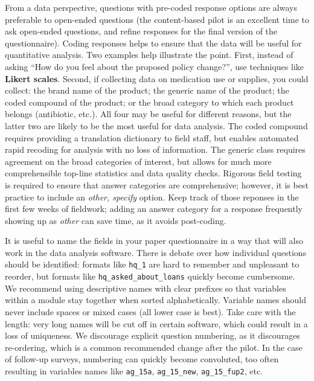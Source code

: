 From a data perspective, questions with pre-coded response options are always preferable to open-ended questions (the content-based pilot is an excellent time to ask open-ended questions, and refine responses for the final version of the questionnaire). Coding responses helps to ensure that the data will be useful for quantitative analysis. Two examples help illustrate the point. First, instead of asking ``How do you feel about the proposed policy change?'', use techniques like
\textbf{Likert scales}. Second, if collecting data on medication use or supplies, you could collect: the brand name of the product; the generic name of the product; the coded compound of the product; or the broad category to which each product belongs (antibiotic, etc.). All four may be useful for different reasons, but the latter two are likely to be the most useful for data analysis. The coded compound requires providing a translation dictionary to field staff, but enables automated rapid recoding for analysis with no loss of information. The generic class requires agreement on the broad categories of interest, but allows for much more comprehensible top-line statistics and data quality checks. Rigorous field testing is required to ensure that answer categories are comprehensive; however, it is best practice to include an \textit{other, specify} option. Keep track of those reponses in the first few weeks of fieldwork; adding an answer category for a response frequently showing up as \textit{other} can save time, as it avoids post-coding.

It is useful to name the fields in your paper questionnaire in a way that will also work in the data analysis software.
There is debate over how individual questions should be identified: formats like \texttt{hq\_1} are hard to remember and unpleasant to reorder, but formats like \texttt{hq\_asked\_about\_loans} quickly become cumbersome.
We recommend using descriptive names with clear prefixes so that variables
within a module stay together when sorted
alphabetically.
 Variable names should never include spaces or mixed cases (all lower case is
best). Take care with the length: very long names will be cut off in certain
software, which could result in a loss of uniqueness. We discourage explicit
question numbering, as it discourages re-ordering, which is a common
recommended change after the pilot. In the case of follow-up surveys, numbering
can quickly become convoluted, too often resulting in variables names like
\texttt{ag\_15a}, \texttt{ag\_15\_new}, \texttt{ag\_15\_fup2}, etc.

